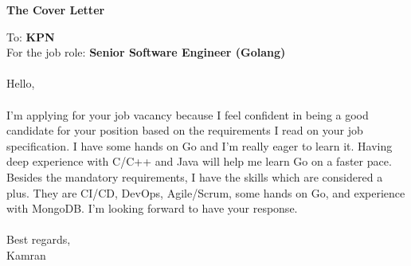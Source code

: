 \documentclass[10pt,a4paper]{article}
\begin{document}
\noindent \textbf{The Cover Letter}

\vspace{3cm}

\noindent To: \textbf{KPN} \\
For the job role: \textbf{Senior Software Engineer (Golang)} \\ \\

\noindent Hello, \\ \\

\noindent I'm applying for your job vacancy because I feel confident in being a good candidate for your position based on the requirements I read on your job specification. I have some hands on Go and I'm really eager to learn it. Having deep experience with C/C++ and Java will help me learn Go on a faster pace. Besides the mandatory requirements, I have the skills which are considered a plus. They are CI/CD, DevOps, Agile/Scrum, some hands on Go, and experience with MongoDB. I'm looking forward to have your response.  \\ \\

\noindent Best regards, \\
\noindent Kamran
\end{document}
